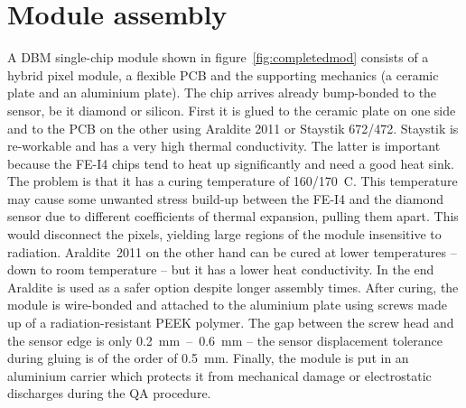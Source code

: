 \section{Module assembly}
\label{sec:modass}

A DBM single-chip module shown in figure~\ref{fig:completedmod} consists of a hybrid pixel module, a flexible PCB and the supporting mechanics (a ceramic plate and an aluminium plate). The chip arrives already bump-bonded to the sensor, be it diamond or silicon. First it is glued to the ceramic plate on one side and to the PCB on the other using Araldite 2011 or Staystik 672/472. 
Staystik is re-workable and has a very high thermal conductivity. The latter is important because the FE-I4 chips tend to heat up significantly and need a good heat sink. The problem is that it has a curing temperature of 160/170~\textdegree C. This temperature may cause some unwanted stress build-up between the FE-I4 and the diamond sensor due to different coefficients of thermal expansion, pulling them apart. This would disconnect the pixels, yielding large regions of the module insensitive to radiation. Araldite~2011 on the other hand can be cured at lower temperatures -- down to room temperature -- but it has a lower heat conductivity. In the end Araldite is used as a safer option despite longer assembly times. After curing, the module is wire-bonded and attached to the aluminium plate using screws made up of a radiation-resistant PEEK polymer. The gap between the screw head and the sensor edge is only 0.2~mm~--~0.6~mm -- the sensor displacement tolerance during gluing is of the order of 0.5~mm. Finally, the module is put in an aluminium carrier which protects it from mechanical damage or electrostatic discharges during the QA procedure.


